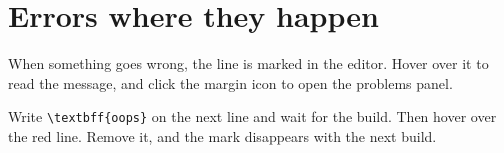 \section{Errors where they happen}

When something goes wrong, the line is marked in the editor. Hover over it to
read the message, and click the margin icon to open the problems panel.

\begin{tryit}
  Write \verb|\textbff{oops}| on the next line and wait for the build. Then hover
  over the red line. Remove it, and the mark disappears with the next build.
\end{tryit}
